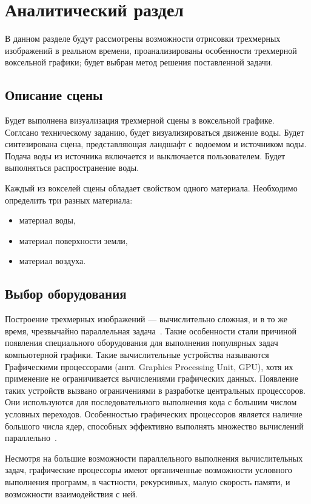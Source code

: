 \chapter{Аналитический раздел}

В данном разделе будут рассмотрены возможности отрисовки 
трехмерных изображений в реальном времени, проанализированы особенности трехмерной 
воксельной графики; будет выбран метод решения поставленной задачи.

\section{Описание сцены}

Будет выполнена визуализация трехмерной сцены в воксельной графике. Соглсано
техническому заданию, будет визуализироваться движение воды. Будет синтезирована 
сцена, представляющая ландшафт с водоемом и источником воды. Подача воды из источника
включается и выключается пользователем. Будет выполняться распространение воды.

Каждый из вокселей сцены обладает свойством одного материала. 
Необходимо определить три разных материала: 
\begin{itemize}
    \item материал воды,
    \item материал поверхности земли,
    \item материал воздуха.
\end{itemize}

\section{Выбор оборудования}

Построение трехмерных изображений --- вычислительно сложная, и в то же время, чрезвычайно 
параллельная задача~\cite{DaBPP}. Такие особенности стали причиной появления специального оборудования 
для выполнения популярных задач компьютерной графики. Такие вычислительные устройства
называются Графическими процессорами (англ. Graphics Processing Unit, GPU), хотя их применение не ограничивается вычислениями
графических данных. Появление таких устройств вызвано ограничениями в разработке центральных
процессоров. Они используются для последовательного выполнения кода с большим числом условных 
переходов.
Особенностью графических процессоров является наличие большого числа ядер, способных эффективно 
выполнять множество вычислений параллельно~\cite{ACLaG}.

Несмотря на большие возможности параллельного выполнения вычислительных задач,
графические процессоры имеют органиченные возможности условного выполнения программ, в 
частности, рекурсивных, малую скорость памяти, и возможности взаимодействия с ней.

